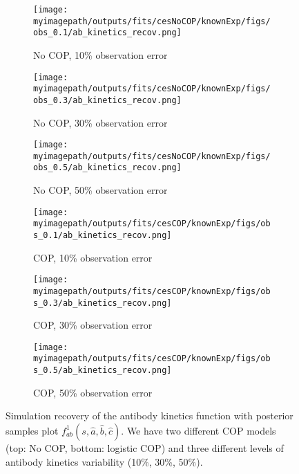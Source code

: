 \begin{figure}[H]
    \centering
    \begin{subfigure}{0.31\textwidth}
        \centering
        \texttt{[image: \\myimagepath/outputs/fits/cesNoCOP/knownExp/figs/obs\_0.1/ab\_kinetics\_recov.png]}
        \caption{No COP, 10\% observation error}
    \end{subfigure}
    \begin{subfigure}{0.31\textwidth}
        \centering
        \texttt{[image: \\myimagepath/outputs/fits/cesNoCOP/knownExp/figs/obs\_0.3/ab\_kinetics\_recov.png]}
        \caption{No COP, 30\% observation error}
    \end{subfigure}
    \begin{subfigure}{0.31\textwidth}
        \centering
        \texttt{[image: \\myimagepath/outputs/fits/cesNoCOP/knownExp/figs/obs\_0.5/ab\_kinetics\_recov.png]}
        \caption{No COP, 50\% observation error}
    \end{subfigure}
    
  \begin{subfigure}{0.31\textwidth}
        \centering
        \texttt{[image: \\myimagepath/outputs/fits/cesCOP/knownExp/figs/obs\_0.1/ab\_kinetics\_recov.png]}
        \caption{ COP, 10\% observation error}
    \end{subfigure}
    \begin{subfigure}{0.31\textwidth}
        \centering
        \texttt{[image: \\myimagepath/outputs/fits/cesCOP/knownExp/figs/obs\_0.3/ab\_kinetics\_recov.png]}
        \caption{ COP, 30\% observation error}
    \end{subfigure}
    \begin{subfigure}{0.31\textwidth}
        \centering
        \texttt{[image: \\myimagepath/outputs/fits/cesCOP/knownExp/figs/obs\_0.5/ab\_kinetics\_recov.png]}
        \caption{ COP, 50\% observation error}
    \end{subfigure}
    
    \caption{Simulation recovery of the antibody kinetics function with posterior samples plot $f^1_{ab}(s, \hat{a}, \hat{b}, \hat{c})$. We have two different COP models (top: No COP, bottom: logistic COP) and three different levels of antibody kinetics variability (10\%, 30\%, 50\%). \label{fit1:ab}
}

\end{figure}



